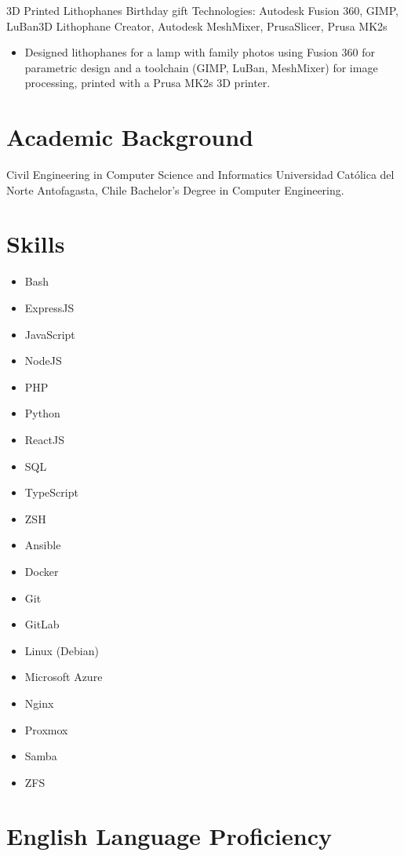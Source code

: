 \documentclass[12pt,letterpaper,sans]{moderncv}
\begin{document}
\cventry{}
{3D Printed Lithophanes}
{Birthday gift}
{\newline Technologies: Autodesk Fusion 360, GIMP, LuBan3D Lithophane Creator, Autodesk MeshMixer, PrusaSlicer, Prusa MK2s}
{\newline}
{
  \begin{itemize}
    \item Designed lithophanes for a lamp with family photos using Fusion 360 for parametric design and a toolchain (GIMP, LuBan, MeshMixer) for image processing, printed with a Prusa MK2s 3D printer.
  \end{itemize}
}
\vspace{0.5em}

\newpage

\section{Academic Background}
{Civil Engineering in Computer Science and Informatics}
{Universidad Católica del Norte}
{\newline Antofagasta, Chile}
{\newline Bachelor’s Degree in Computer Engineering.}
{}

\section{Skills}
\begin{cvcolumns}
  {
    \begin{itemize}
      \item Bash
      \item ExpressJS
      \item JavaScript
      \item NodeJS
      \item PHP
      \item Python
      \item ReactJS
      \item SQL
      \item TypeScript
      \item ZSH
    \end{itemize}
  }
  {
    \begin{itemize}
      \item Ansible
      \item Docker
      \item Git
      \item GitLab
      \item Linux (Debian)
      \item Microsoft Azure
      \item Nginx
      \item Proxmox
      \item Samba
      \item ZFS
    \end{itemize}
  }
\end{cvcolumns}

\section{English Language Proficiency}
\end{document}
